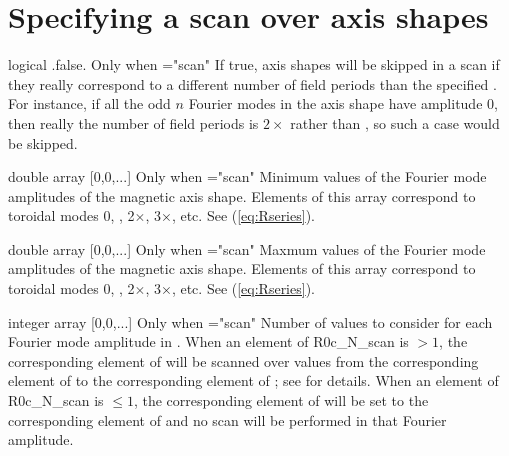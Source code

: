 \myhrule


\section{Specifying a scan over axis shapes}

{logical}
{{\ttfamily .false.}}
{Only when ={\ttfamily "scan"}}
{If true, axis shapes will be skipped in a scan if they really correspond to a different number of field periods than the specified . For instance, if all the odd $n$ Fourier modes in the axis shape have amplitude 0, then really the number of field periods is $2\times$  rather than , so such a case would be skipped.}

\myhrule

{double array}
{[0,0,...]}
{Only when ={\ttfamily "scan"}}
{Minimum values of the Fourier mode amplitudes of the magnetic axis shape. Elements of this array correspond to toroidal modes 0, , 2$\times$, 3$\times$, etc.  See (\ref{eq:Rseries}).
}

\myhrule

{double array}
{[0,0,...]}
{Only when ={\ttfamily "scan"}}
{Maxmum values of the Fourier mode amplitudes of the magnetic axis shape. Elements of this array correspond to toroidal modes 0, , 2$\times$, 3$\times$, etc.  See (\ref{eq:Rseries}).
}

\myhrule

{integer array}
{[0,0,...]}
{Only when ={\ttfamily "scan"}}
{Number of values to consider for each Fourier mode amplitude in . When an element of {\ttfamily R0c\_N\_scan} is $>1$, the corresponding element of  will be scanned over  values from the corresponding element of  to the corresponding element of ; see  for details.  When an element of {\ttfamily R0c\_N\_scan} is $\le 1$, the corresponding element of  will be set to the corresponding element of  and no scan will be performed in that Fourier amplitude.
}

